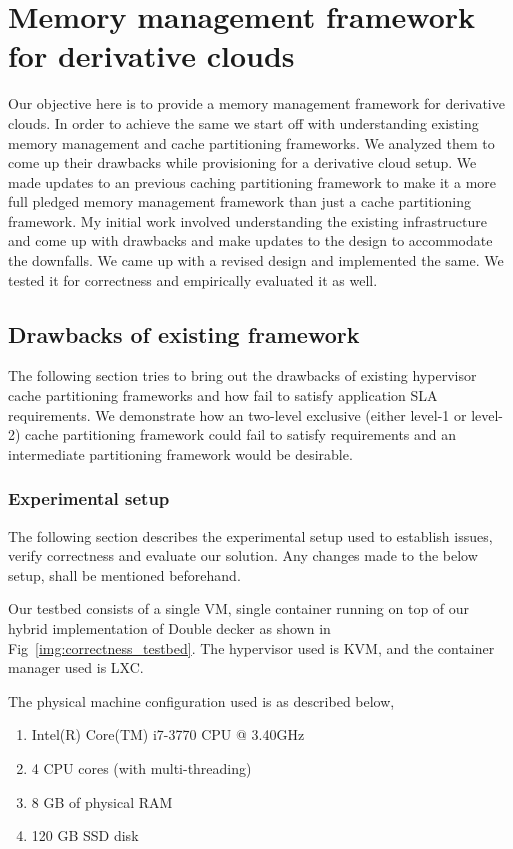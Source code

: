 \chapter{Memory management framework for derivative clouds}
  
  Our objective here is to provide a memory management framework for derivative clouds. 
  In order to achieve the same we start off with understanding existing memory management 
  and cache partitioning frameworks. We analyzed them to come up their drawbacks while 
  provisioning for a derivative cloud setup. We made updates to an previous caching partitioning
  framework to make it a more full pledged memory management framework than just a cache partitioning
  framework. My initial work involved understanding the existing infrastructure and come up with
  drawbacks and make updates to the design to accommodate the downfalls. We came up with a revised 
  design and implemented the same. We tested it for correctness and empirically evaluated it as well.
  
  \section{Drawbacks of existing framework}
    The following section tries to bring out the drawbacks of existing hypervisor cache partitioning 
    frameworks and how fail to satisfy application SLA requirements. We demonstrate how an two-level
    exclusive (either level-1 or level-2) cache partitioning framework could fail to satisfy requirements 
    and an intermediate partitioning framework would be desirable.
    
    \subsection{Experimental setup}
    \label{sec:dd_setup}
	
      The following section describes the experimental setup used to establish issues, verify correctness and evaluate our 
      solution. Any changes made to the below setup, shall be mentioned beforehand.
      
	Our testbed consists of a single VM, single container running on top of our hybrid implementation of Double decker as shown 
	in Fig~\ref{img:correctness_testbed}. The hypervisor used is KVM, and the container manager used is LXC.  
	
	
	\noindent The physical machine configuration used is as described below,
	  \begin{enumerate}
	   \item Intel(R) Core(TM) i7-3770 CPU @ 3.40GHz
	   \item 4 CPU cores (with multi-threading)
	   \item 8 GB of physical RAM
	   \item 120 GB SSD disk
	  \end{enumerate}

